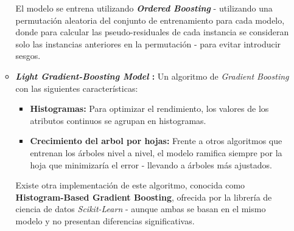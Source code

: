 \begin{itemize}[leftmargin=*, parsep=2pt, itemsep=2pt, topsep=4pt]
\begin{itemize}[parsep=1pt, itemsep=1pt, topsep=4pt]
		El modelo se entrena utilizando \textbf{\textit{Ordered Boosting}} - utilizando una permutación aleatoria del conjunto de entrenamiento para cada modelo, donde para calcular las pseudo-residuales de cada instancia se consideran solo las instancias anteriores en la permutación \cite{catboost2} - para evitar introducir sesgos.
		\item \textbf{\textit{Light Gradient-Boosting Model} \cite{NIPS2017_6449f44a}:} Un algoritmo de \textit{Gradient Boosting} con las siguientes características:
		\begin{itemize}
			\item \textbf{Histogramas:} Para optimizar el rendimiento, los valores de los atributos continuos se agrupan en histogramas.
			\item \textbf{Crecimiento del arbol por hojas:} Frente a otros algoritmos que entrenan los árboles nivel a nivel, el modelo ramifica siempre por la hoja que minimizaría el error - llevando a árboles más ajustados.
		\end{itemize}
		
		Existe otra implementación de este algoritmo, conocida como \textbf{Histogram-Based Gradient Boosting}, ofrecida por la librería de ciencia de datos \textit{Scikit-Learn} \cite{scikit-learn} - aunque ambas se basan en el mismo modelo y no presentan diferencias significativas.
	\end{itemize}
\end{itemize}


